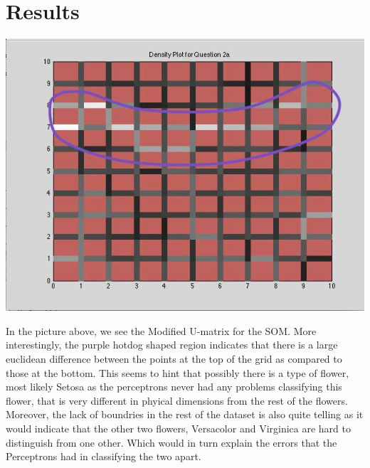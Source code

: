 \documentclass[epsfig]{article}
\begin{document}
\section*{Results}
\begin{center}
\includegraphics[scale=0.5]{pic7}
\end{center}
In the picture above, we see the Modified U-matrix for the SOM. More interestingly, the purple hotdog shaped  region indicates that there is a large euclidean difference between the points at the top of the grid as compared to those at the bottom. This seems to hint that possibly there is a type of flower, most likely Setosa as the perceptrons never had any problems classifying this flower, that is very different in phyical dimensions from the rest of the flowers. Moreover, the lack of boundries in the rest of the dataset is also quite telling as it would indicate that the other two flowers, Versacolor and Virginica are hard to distinguish from one other. Which would in turn explain the errors that the Perceptrons had in classifying the two apart.
\end{document}
